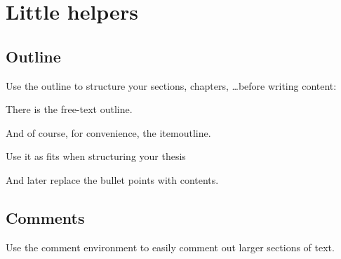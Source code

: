 \section{Little helpers}



\subsection{Outline}

Use the outline to structure your sections, chapters, \ldots before writing content:

\begin{outline}
  There is the free-text outline.
\end{outline}

\begin{itemoutline}
\item And of course, for convenience, the itemoutline.
\item Use it as fits when structuring your thesis
\item And later replace the bullet points with contents.
\end{itemoutline}



\subsection{Comments}

Use the comment environment to easily comment out larger sections of text.

\begin{comment}
  Bla bla bla bla bla bla bla bla bla bla bla bla bla bla bla bla bla bla bla bla bla bla bla bla bla bla bla bla bla bla bla bla bla bla bla bla bla bla bla bla bla bla bla bla bla bla bla bla bla bla bla bla bla bla bla bla bla bla bla bla bla bla bla bla bla bla bla bla bla bla bla bla bla bla bla bla bla bla bla bla bla bla bla bla bla bla bla bla bla bla bla bla bla bla bla bla bla bla bla bla bla bla bla bla bla bla bla bla bla bla bla bla bla bla bla bla bla bla bla bla bla bla bla bla bla bla bla bla bla bla bla bla bla bla bla bla bla bla bla bla bla bla bla bla bla bla bla bla bla bla bla bla bla bla bla bla bla bla bla bla bla bla bla bla bla bla bla bla bla bla bla bla bla bla bla bla bla bla bla bla bla bla bla bla bla bla bla bla bla bla bla bla bla bla bla bla bla bla bla bla bla bla bla bla bla bla bla bla bla bla bla bla bla bla bla bla bla bla bla bla bla bla bla bla bla bla bla bla bla bla bla bla bla bla bla bla bla bla bla bla bla bla bla bla bla bla bla bla bla bla bla bla bla bla bla bla bla bla bla bla bla bla bla bla bla bla bla bla bla bla bla bla bla bla bla bla bla bla bla bla bla bla bla bla bla bla bla bla bla bla bla bla bla bla bla bla bla bla bla bla bla bla bla bla bla bla bla bla bla bla bla bla bla bla bla bla bla bla bla bla bla!
\end{comment}



